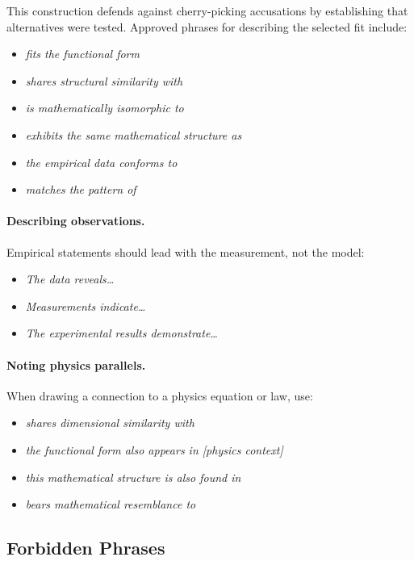 This construction defends against cherry-picking accusations by establishing
that alternatives were tested. Approved phrases for describing the selected
fit include:

\begin{itemize}
  \item \emph{fits the functional form}
  \item \emph{shares structural similarity with}
  \item \emph{is mathematically isomorphic to}
  \item \emph{exhibits the same mathematical structure as}
  \item \emph{the empirical data conforms to}
  \item \emph{matches the pattern of}
\end{itemize}

\paragraph{Describing observations.}
Empirical statements should lead with the measurement, not the model:

\begin{itemize}
  \item \emph{The data reveals\ldots}
  \item \emph{Measurements indicate\ldots}
  \item \emph{The experimental results demonstrate\ldots}
\end{itemize}

\paragraph{Noting physics parallels.}
When drawing a connection to a physics equation or law, use:

\begin{itemize}
  \item \emph{shares dimensional similarity with}
  \item \emph{the functional form also appears in [physics context]}
  \item \emph{this mathematical structure is also found in}
  \item \emph{bears mathematical resemblance to}
\end{itemize}

\subsection{Forbidden Phrases}

